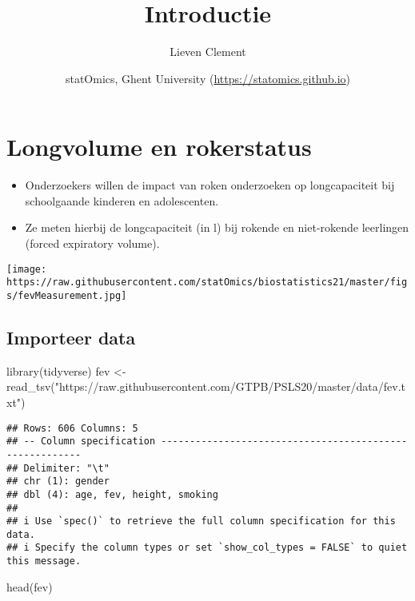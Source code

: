 \documentclass[
]{article}
\title{Introductie}
\author{Lieven Clement}
\date{statOmics, Ghent University (\url{https://statomics.github.io})}
\newenvironment{Shaded}{\begin{snugshade}}{\end{snugshade}}
\newcommand{\FunctionTok}[1]{\textcolor[rgb]{0.00,0.00,0.00}{#1}}
\newcommand{\NormalTok}[1]{#1}
\newcommand{\OtherTok}[1]{\textcolor[rgb]{0.56,0.35,0.01}{#1}}
\newcommand{\StringTok}[1]{\textcolor[rgb]{0.31,0.60,0.02}{#1}}
\providecommand{\tightlist}{%
  \setlength{\itemsep}{0pt}\setlength{\parskip}{0pt}}
\begin{document}
\maketitle

{
\setcounter{tocdepth}{2}
\tableofcontents
}
\hypertarget{longvolume-en-rokerstatus}{%
\section{Longvolume en rokerstatus}\label{longvolume-en-rokerstatus}}

\begin{itemize}
\tightlist
\item
  Onderzoekers willen de impact van roken onderzoeken op longcapaciteit
  bij schoolgaande kinderen en adolescenten.
\item
  Ze meten hierbij de longcapaciteit (in l) bij rokende en niet-rokende
  leerlingen (forced expiratory volume).
\end{itemize}

\texttt{[image: https://raw.githubusercontent.com/statOmics/biostatistics21/master/figs/fevMeasurement.jpg]}

\hypertarget{importeer-data}{%
\subsection{Importeer data}\label{importeer-data}}

\begin{Shaded}
\begin{Highlighting}[]
\FunctionTok{library}\NormalTok{(tidyverse)}
\NormalTok{fev }\OtherTok{\textless{}{-}} \FunctionTok{read\_tsv}\NormalTok{(}\StringTok{"https://raw.githubusercontent.com/GTPB/PSLS20/master/data/fev.txt"}\NormalTok{)}
\end{Highlighting}
\end{Shaded}

\begin{verbatim}
## Rows: 606 Columns: 5
## -- Column specification --------------------------------------------------------
## Delimiter: "\t"
## chr (1): gender
## dbl (4): age, fev, height, smoking
## 
## i Use `spec()` to retrieve the full column specification for this data.
## i Specify the column types or set `show_col_types = FALSE` to quiet this message.
\end{verbatim}

\begin{Shaded}
\begin{Highlighting}[]
\FunctionTok{head}\NormalTok{(fev)}
\end{Highlighting}
\end{Shaded}
\end{document}
